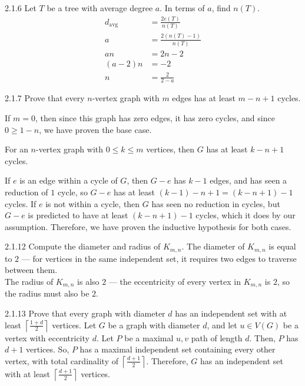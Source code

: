 \documentclass[9pt]{extarticle}
\begin{document}
  \begin{problem}{2.1.6}
    Let $T$ be a tree with average degree $a$. In terms of $a$, find $n(T)$.
    \tcblower
    \begin{align*}
      d_{\textrm{avg}} &= \frac{2e(T)}{n(T)}\\
                    a  &= \frac{2(n(T) - 1)}{n(T)} \\
                    an &= 2n-2 \\
              (a-2)n &= -2 \\
              n &= \boxed{\frac{2}{2-a}}
    \end{align*}
  \end{problem}
  \begin{problem}{2.1.7}
    Prove that every $n$-vertex graph with $m$ edges has at least $m-n+1$ cycles.
    \tcblower
    \begin{description}[font=\normalfont\scshape]
      \item[Base Case] If $m = 0$, then since this graph has zero edges, it has zero cycles, and since $0\geq 1-n$, we have proven the base case.
      \item[Inductive Hypothesis] For an $n$-vertex graph with $0\leq k\leq m$ vertices, then $G$ has at least $k-n+1$ cycles.
      \item[Proof] If $e$ is an edge within a cycle of $G$, then $G-e$ has $k-1$ edges, and has seen a reduction of $1$ cycle, so $G-e$ has at least $(k-1)-n+1 = (k-n+1)-1$ cycles. If $e$ is not within a cycle, then $G$ has seen no reduction in cycles, but $G-e$ is predicted to have at least $(k-n+1)-1$ cycles, which it does by our assumption. Therefore, we have proven the inductive hypothesis for both cases.
    \end{description}
  \end{problem}
  \begin{problem}{2.1.12}
    Compute the diameter and radius of $K_{m,n}$.
    \tcblower
    The diameter of $K_{m,n}$ is equal to $2$ --- for vertices in the same independent set, it requires two edges to traverse between them.\\

    The radius of $K_{m,n}$ is also $2$ --- the eccentricity of every vertex in $K_{m,n}$ is $2$, so the radius must also be $2$.
  \end{problem}
  \begin{problem}{2.1.13}
    Prove that every graph with diameter $d$ has an independent set with at least $\left\lceil\frac{1+d}{2}\right\rceil$ vertices.
    \tcblower
    Let $G$ be a graph with diameter $d$, and let $u\in V(G)$ be a vertex with eccentricity $d$. Let $P$ be a maximal $u,v$ path of length $d$. Then, $P$ has $d+1$ vertices. So, $P$ has a maximal independent set containing every other vertex, with total cardinality of $\left\lceil \frac{d+1}{2} \right\rceil$. Therefore, $G$ has an independent set with at least $\left\lceil\frac{d+1}{2}\right\rceil$ vertices.
  \end{problem}
\end{document}
